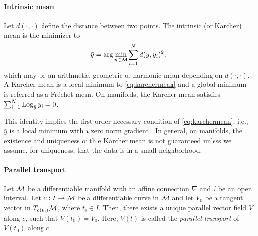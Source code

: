 \paragraph{Intrinsic mean} 
Let $d(\cdot,\cdot)$ define the distance between two points. The intrinsic (or Karcher) mean is the minimizer to
{\small \begin{equation}
\label{eq:karchermean}
\bar{y} = \arg \min_{y \in \mathcal{M}} \sum_{i=1}^{N} d(y,y_{i})^{2}, 
\end{equation}}
which may be an arithmetic, geometric or harmonic mean depending on $d(\cdot,\cdot)$. A Karcher mean is a local minimum to \eqref{eq:karchermean} and a global minimum is referred as a Fr\'{e}chet mean. On manifolds, the Karcher mean satisfies $\sum_{i=1}^{N} \operatorname*{Log}_{\bar{y}}y_i =0$.

\iffalse
 \begin{figure}
 \begin{center}
 \begin{minipage}{.45\linewidth} 
 \begin{algorithmic}[plain]
 \STATE \textbf{Algorithm 1 : Karcher mean}
 \STATE Input: $y_{1}, \ldots, y_{N} \in \Mc$, $\alpha$
 \STATE Output: $\bar{y} \in \Mc$
 \STATE $\bar{y}_{0} = y_{1}$
 \WHILE {$ \| \sum_{i=1}^{N} \LOG(\bar{y}_{k},y_{i})\| > \epsilon$}
 \STATE $\Delta\bar{y} = \frac{\alpha}{N} \sum_{i=1}^{N}\LOG (\bar{y}_k,y_i)$
 \STATE $\bar{y}_{k+1} = \EXP(\bar{y}_k,\Delta \bar{y})$
 \ENDWHILE
  \end{algorithmic}
  \end{minipage}
  \end{center}
 \caption{Karcher mean on manifolds}
     \label{alg:karcher} 
 \end{figure}
 \fi
 
This identity implies the first order necessary condition of \eqref{eq:karchermean}, i.e., $\bar{y}$ is a local minimum with a zero norm gradient \citep{karcher1977riemannian}. In general, on manifolds, the existence and uniqueness of th.e Karcher mean is not guaranteed unless we assume, for uniqueness, that the data is in a small neighborhood.\\

\paragraph{Parallel transport} 
Let $\mathcal{M}$ be a differentiable manifold with an affine connection $\nabla$ and $I$ be an open interval. Let $c:I \rightarrow \mathcal{M}$ be a differentiable curve in $\mathcal{M}$ and let $V_0$ be a tangent vector in $T_{c(t_0)}\mathcal{M}$, where $t_{0} \in I$. 
Then, there exists a unique parallel vector field $V$ along $c$, such that $V(t_0)=V_0$. Here, $V(t)$ is called the \textit{parallel transport} of $V(t_0)$ along $c$. 

